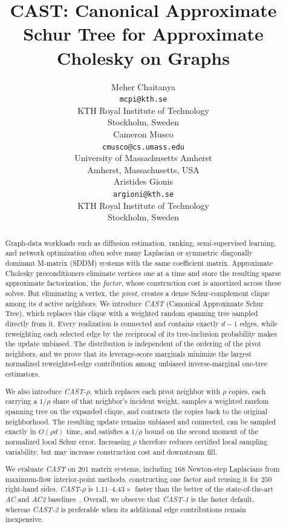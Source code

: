 \documentclass{article}
\title{CAST: Canonical Approximate Schur Tree for Approximate Cholesky on Graphs}
\author{
  Meher Chaitanya\\
  \texttt{mcpi@kth.se}\\
  KTH Royal Institute of Technology\\
  Stockholm, Sweden\\
  \And
  Cameron Musco\\
  \texttt{cmusco@cs.umass.edu}\\
  University of Massachusetts Amherst\\
  Amherst, Massachusetts, USA\\
  \AND
   Aristides Gionis\\
\texttt{argioni@kth.se}\\
KTH Royal Institute of Technology\\
  Stockholm, Sweden\\
}
\newcommand{\CAST}{\textit{CAST}\xspace}
\newcommand{\CASTone}{\textit{CAST-1}\xspace}
\newcommand{\CASTtwo}{\textit{CAST-2}\xspace}
\newcommand{\AC}{\textit{AC}\xspace}
\newcommand{\ACtwo}{\textit{AC2}\xspace}
\newcommand{\1}{\mathbbm{1}}
\theoremstyle{plain}
\begin{document}
\maketitle


\begin{abstract}

Graph-data workloads such as diffusion estimation, ranking, semi-supervised learning, and network optimization often solve many Laplacian or symmetric diagonally dominant M-matrix (SDDM) systems with the same coefficient matrix. Approximate Cholesky preconditioners eliminate vertices one at a time and store the resulting sparse approximate factorization, the \emph{factor}, whose construction cost is amortized across these solves. But eliminating a vertex, the \emph{pivot}, creates a dense
Schur-complement clique among its $d$ active neighbors. We introduce \CAST{} (Canonical Approximate Schur Tree), which replaces this clique with a weighted random spanning tree sampled directly from it. Every realization is connected and contains exactly $d-1$ edges, while reweighting each selected edge by the reciprocal of its tree-inclusion probability makes the update unbiased. The distribution is independent of the ordering of the pivot neighbors, and we prove that its leverage-score marginals minimize the largest normalized reweighted-edge contribution among unbiased inverse-marginal one-tree estimators.

We also introduce \CAST-$\rho$, which replaces each pivot neighbor with $\rho$ copies, each carrying a $1/\rho$ share of that neighbor's incident weight, samples a weighted random spanning tree on the expanded clique, and contracts the copies back to the original neighborhood. The resulting update remains unbiased and connected, can be sampled exactly in $O(\rho d)$ time, and satisfies a $1/\rho$ bound on the second moment of the normalized local Schur
error. Increasing $\rho$ therefore reduces certified local sampling
variability, but may increase construction cost and downstream fill.


We evaluate \CAST{} on $201$ matrix systems, including $168$ Newton-step Laplacians from maximum-flow interior-point methods, constructing one factor and reusing it for $250$ right-hand sides.  \CAST-$\rho$ is $1.11$--$4.43\times$ faster than the better of the state-of-the-art \AC{} and \ACtwo{} baselines~\cite{AC}. Overall, we observe that \CASTone{} is the faster default, whereas \CASTtwo{} is preferable when its additional edge contributions remain inexpensive.

\end{abstract}
\end{document}
